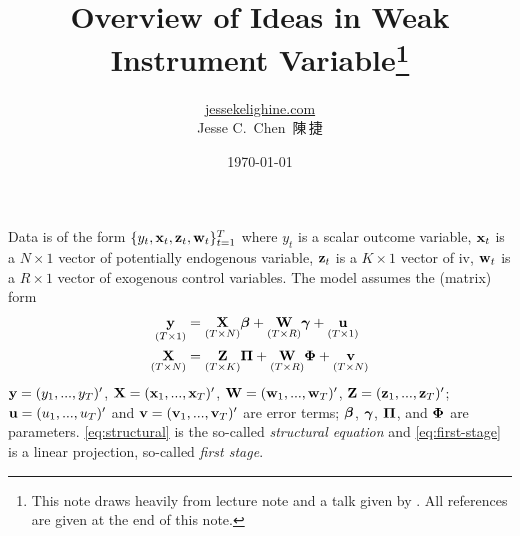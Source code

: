 \documentclass[a4paper]{article}
\title{Overview of Ideas in Weak Instrument Variable\thanks{%
This note draws heavily from lecture note \textcite{shi-2012} and a talk given by \textcite{stock-2008}.
All references are given at the end of this note.}}
\author{\href{https://jessekelighine.com}{jessekelighine.com}\\Jesse C.\ Chen\ 陳\,捷}
\date{\today}
\begin{document}
\maketitle

\begin{definition}
	Data is of the form $\{y_t,\mathbf{x}_t,\mathbf{z}_t,\mathbf{w}_t\}_{t=1}^{T}$ where
	$y_t$ is a scalar outcome variable,
	$\mathbf{x}_t$ is a $N\times 1$ vector of potentially endogenous variable,
	$\mathbf{z}_t$ is a $K\times 1$ vector of \gls*{iv},
	$\mathbf{w}_t$ is a $R\times 1$ vector of exogenous control variables.
	The model assumes the (matrix) form
	\begin{align}
		\underset{(T\times 1)}{\mathbf{y}}
		&= \underset{(T\times N)}{\mathbf{X}}\boldsymbol{\beta} + \underset{(T\times R)}{\mathbf{W}}\boldsymbol{\gamma} + \underset{(T\times 1)}{\mathbf{u}}
		\label{eq:structural} \\
		\underset{(T\times N)}{\mathbf{X}}
		&= \underset{(T\times K)}{\mathbf{Z}}\boldsymbol{\Pi} + \underset{(T\times R)}{\mathbf{W}}\boldsymbol{\Phi} + \underset{(T\times N)}{\mathbf{v}}
		\label{eq:first-stage}
	\end{align}
	$\mathbf{y}=(y_1,...,y_T)'$,
	$\mathbf{X}=(\mathbf{x}_1,...,\mathbf{x}_T)'$,
	$\mathbf{W}=(\mathbf{w}_1,...,\mathbf{w}_T)'$,
	$\mathbf{Z}=(\mathbf{z}_1,...,\mathbf{z}_T)'$;
	$\mathbf{u}=(u_1,...,u_T)'$ and $\mathbf{v}=(\mathbf{v}_1,...,\mathbf{v}_T)'$ are error terms;
	$\boldsymbol{\beta}$, $\boldsymbol{\gamma}$, $\boldsymbol{\Pi}$, and $\boldsymbol{\Phi}$ are parameters.
	\autoref{eq:structural} is the so-called \emph{structural equation} and
	\autoref{eq:first-stage} is a linear projection, so-called \emph{first stage}.
\end{definition}
\end{document}
